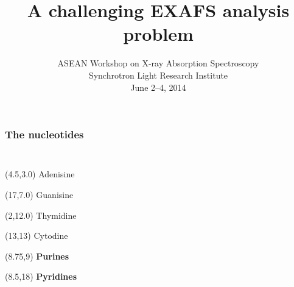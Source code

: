 \documentclass[10pt, xcolor=x11names, compress]{beamer}
\title{A challenging EXAFS analysis problem}
\date[ACXAS 2014]{ASEAN Workshop on X-ray Absorption Spectroscopy\\
  Synchrotron Light Research Institute\\June 2--4, 2014}
\begin{document}
\maketitle


\begin{frame}
  \frametitle{The nucleotides}
  \begin{columns}[T]
    \begin{column}{0.5\linewidth}
      {\tiny
        }
    \end{column}
    \begin{column}{0.5\linewidth}
      {\tiny 
        }
    \end{column}
  \end{columns}

  \bigskip

  \begin{columns}[T]
    \begin{column}{0.5\linewidth}
      {\tiny
        
      }     
    \end{column}
    \begin{column}{0.5\linewidth}
      {\tiny
        
      }      
    \end{column}
  \end{columns}

  \begin{textblock*}{0.2\linewidth}(4.5\TPHorizModule,3.0\TPVertModule)%
    Adenisine
  \end{textblock*}
  \begin{textblock*}{0.2\linewidth}(17\TPHorizModule,7.0\TPVertModule)%
    Guanisine
  \end{textblock*}
  \begin{textblock*}{0.2\linewidth}(2\TPHorizModule,12.0\TPVertModule)%
    Thymidine
  \end{textblock*}
  \begin{textblock*}{0.2\linewidth}(13\TPHorizModule,13\TPVertModule)%
    Cytodine
  \end{textblock*}
  \begin{textblock*}{0.2\linewidth}(8.75\TPHorizModule,9\TPVertModule)%
    \textbf{Purines}
  \end{textblock*}
  \begin{textblock*}{0.2\linewidth}(8.5\TPHorizModule,18\TPVertModule)%
    \textbf{Pyridines}
  \end{textblock*}
  
\end{frame}
\end{document}
